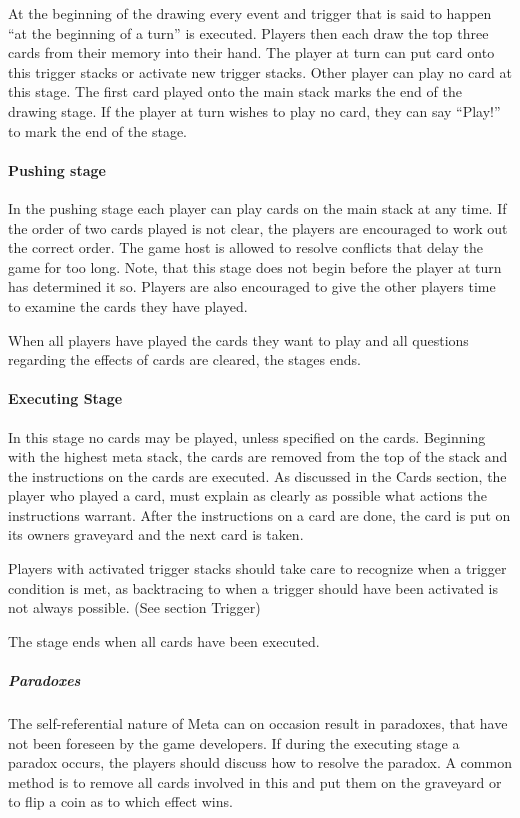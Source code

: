\documentclass[a4paper,10pt]{article}
\begin{document}
At the beginning of the drawing every event and trigger that is said to happen ``at the
beginning of a turn'' is executed. Players then each draw the top three cards from their
memory into their hand. The player at turn can put card onto this trigger stacks or
activate new trigger stacks. Other player can play no card at this stage. The first card
played onto the main stack marks the end of the drawing stage. If the player at turn
wishes to play no card, they can say ``Play!'' to mark the end of the stage.

\paragraph{Pushing stage}

In the pushing stage each player can play cards on the main stack at any time. If the
order of two cards played is not clear, the players are encouraged to work out the
correct order. The game host is allowed to resolve conflicts that delay the game for too
long. Note, that this stage does not begin before the player at turn has determined it
so. Players are also encouraged to give the other players time to examine the cards they
have played.

When all players have played the cards they want to play and all questions regarding the
effects of cards are cleared, the stages ends.

\paragraph{Executing Stage}

In this stage no cards may be played, unless specified on the cards. Beginning with the
highest meta stack, the cards are removed from the top of
the stack and the instructions on the cards are executed. As discussed in the Cards
section, the player who played a card, must explain as clearly as possible what actions
the instructions warrant. After the instructions on a card are done, the card is put on
its owners graveyard and the next card is taken.

Players with activated trigger stacks should take care to recognize when a trigger
condition is met, as backtracing to when a trigger should have been activated is not
always possible. (See section Trigger)

The stage ends when all cards have been executed.

\subparagraph{Paradoxes}

The self-referential nature of Meta can on occasion result in paradoxes, that have not
been foreseen by the game developers. If during the executing stage a paradox occurs, the
players should discuss how to resolve the paradox. A common method is to remove all cards
involved in this and put them on the graveyard or to flip a coin as to which effect wins.
\end{document}

